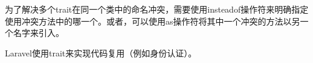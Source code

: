 为了解决多个trait在同一个类中的命名冲突，需要使用insteadof操作符来明确指定使用冲突方法中的哪一个。或者，可以使用as操作符将其中一个冲突的方法以另一个名字来引入。

Laravel使用trait来实现代码复用（例如身份认证）。



\begin{lstlisting}[language=PHP]

\end{lstlisting}



\begin{lstlisting}[language=PHP]

\end{lstlisting}




\begin{lstlisting}[language=PHP]

\end{lstlisting}




\begin{lstlisting}[language=PHP]

\end{lstlisting}



\begin{lstlisting}[language=PHP]

\end{lstlisting}




\begin{lstlisting}[language=PHP]

\end{lstlisting}



\begin{lstlisting}[language=PHP]

\end{lstlisting}



\begin{lstlisting}[language=PHP]

\end{lstlisting}




\begin{lstlisting}[language=PHP]

\end{lstlisting}




